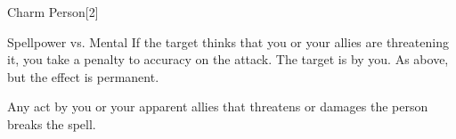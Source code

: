 \begin{spellsection}{Charm Person}[2]
    \begin{spellheader}
    \end{spellheader}
    \begin{spellcontent}
        \begin{spelltargetinginfo}
        \end{spelltargetinginfo}
        \begin{spelleffects}
            \begin{spellattack}{Spellpower vs. Mental}
                \spellspecial If the target thinks that you or your allies are threatening it, you take a  penalty to accuracy on the attack.
                \spellsuccess The target is \charmed by you.
                \spellcritical As above, but the effect is permanent.
            \end{spellattack}
            \spelldur \durlong
        \end{spelleffects}
    \end{spellcontent}
    \begin{spellfooter}
        \spellnotes Any act by you or your apparent allies that threatens or damages the  person breaks the spell.

        \subtlespellnotes

        \norepeatspellnotes
        \miscastrandom
    \end{spellfooter}
    \begin{spellaugments}
    \end{spellaugments}
\end{spellsection}

